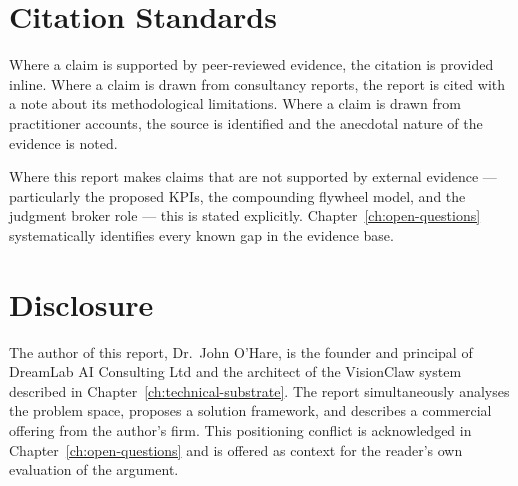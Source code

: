 \section{Citation Standards}

Where a claim is supported by peer-reviewed evidence, the citation is provided inline. Where a claim is drawn from consultancy reports, the report is cited with a note about its methodological limitations. Where a claim is drawn from practitioner accounts, the source is identified and the anecdotal nature of the evidence is noted.

Where this report makes claims that are not supported by external evidence --- particularly the proposed KPIs, the compounding flywheel model, and the judgment broker role --- this is stated explicitly. Chapter~\ref{ch:open-questions} systematically identifies every known gap in the evidence base.

\section{Disclosure}

The author of this report, Dr.\ John O'Hare, is the founder and principal of DreamLab AI Consulting Ltd and the architect of the VisionClaw system described in Chapter~\ref{ch:technical-substrate}. The report simultaneously analyses the problem space, proposes a solution framework, and describes a commercial offering from the author's firm. This positioning conflict is acknowledged in Chapter~\ref{ch:open-questions} and is offered as context for the reader's own evaluation of the argument.
